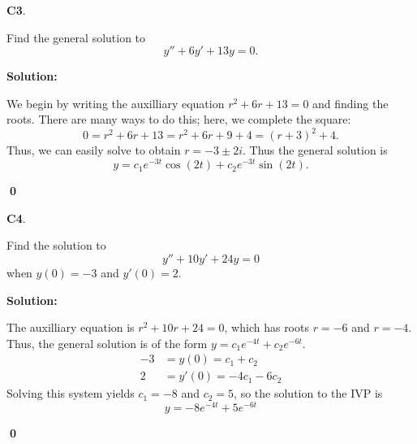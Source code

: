 \documentclass{article}
\newenvironment{problem}[1]
{
  \begin{flushleft}
  \textbf{#1}.
  \ignorespaces
}
{
  \end{flushleft}
}
\newenvironment{solution}
{
  \ignorespaces
  \textbf{Solution:}
}
{
  \ignorespacesafterend
  \begin{flushright}
  {\bfseries \qed}
  \end{flushright}
}
\begin{document}
\begin{problem}{C3}
Find the general solution to \[y''+6y'+13y=0.\]
\end{problem}
\begin{solution}
We begin by writing the auxilliary equation \(r^2+6r+13=0\) and finding the roots.  There are many ways to do this; here, we complete  the square:
\[0=r^2+6r+13=r^2+6r+9+4=(r+3)^2+4.\]
Thus, we can easily solve to obtain \(r=-3\pm2i\).  Thus the general solution is
\[ y= c_1 e^{-3t} \cos(2t) + c_2 e^{-3t} \sin(2t) .\]
\end{solution}

\begin{problem}{C4}
Find the solution to
\[
y'' + 10y' + 24y = 0
\]
when \(y(0)=-3\) and \(y'(0)=2\).
\end{problem}
\begin{solution}
The auxilliary equation is \(r^2+10r+24=0\), which has roots \(r=-6\) and \(r=-4\).  Thus, the general solution is of the form \(y=c_1e^{-4t}+c_2e^{-6t}\).  
\begin{align*}
-3 &= y(0) = c_1+c_2 \\
2 &= y'(0)  = -4c_1-6c_2 
\end{align*}
Solving this system yields \(c_1 =-8\) and \(c_2 = 5\), so the solution to the IVP is \[y=-8e^{-4t}+5e^{-6t}\]
\end{solution}
\end{document}
